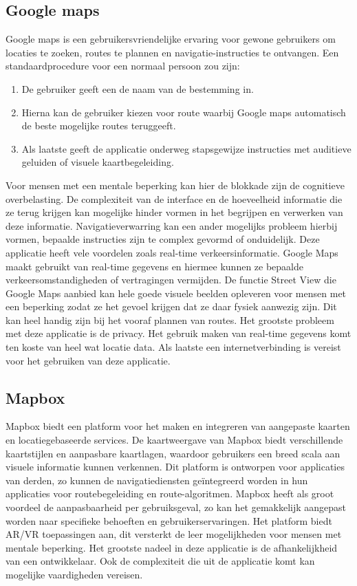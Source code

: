 \subsection{Google maps}
\label{sec:google maps}
Google maps is een gebruikersvriendelijke ervaring voor gewone gebruikers om locaties te zoeken, routes te plannen en navigatie-instructies te ontvangen. Een standaardprocedure voor een normaal persoon zou zijn:
\begin{enumerate}
    \item De gebruiker geeft een de naam van de bestemming in.
    \item Hierna kan de gebruiker kiezen voor route waarbij Google maps automatisch de beste mogelijke routes teruggeeft.
    \item Als laatste geeft de applicatie onderweg stapsgewijze instructies met auditieve geluiden of visuele kaartbegeleiding.
\end{enumerate}
Voor mensen met een mentale beperking kan hier de blokkade zijn de cognitieve overbelasting. De complexiteit van de interface en de hoeveelheid informatie die ze terug krijgen kan mogelijke hinder vormen in het begrijpen en verwerken van deze informatie. Navigatieverwarring kan een ander mogelijks probleem hierbij vormen, bepaalde instructies zijn te complex gevormd of onduidelijk. Deze applicatie heeft vele voordelen zoals real-time verkeersinformatie. Google Maps maakt gebruikt van real-time gegevens en hiermee kunnen ze bepaalde verkeersomstandigheden of vertragingen vermijden. De functie Street View die Google Maps aanbied kan hele goede visuele beelden opleveren voor mensen met een beperking zodat ze het gevoel krijgen dat ze daar fysiek aanwezig zijn. Dit kan heel handig zijn bij het vooraf plannen van routes. Het grootste probleem met deze applicatie is de privacy. Het gebruik maken van real-time gegevens komt ten koste van heel wat locatie data. Als laatste een internetverbinding is vereist voor het gebruiken van deze applicatie.
\subsection{Mapbox}
\label{sec:mapbox}
Mapbox biedt een platform voor het maken en integreren van aangepaste kaarten en locatiegebaseerde services. De kaartweergave van Mapbox biedt verschillende kaartstijlen en aanpasbare kaartlagen, waardoor gebruikers een breed scala aan visuele informatie kunnen verkennen. Dit platform is ontworpen voor applicaties van derden, zo kunnen de navigatiediensten geïntegreerd worden in hun applicaties voor routebegeleiding en route-algoritmen. Mapbox heeft als groot voordeel de aanpasbaarheid per gebruiksgeval, zo kan het gemakkelijk aangepast worden naar specifieke behoeften en gebruikerservaringen. Het platform biedt AR/VR toepassingen aan, dit versterkt de leer mogelijkheden voor mensen met mentale beperking. Het grootste nadeel in deze applicatie is de afhankelijkheid van een ontwikkelaar. Ook de complexiteit die uit de applicatie komt kan mogelijke vaardigheden vereisen.
